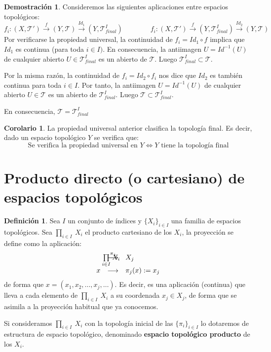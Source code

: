\documentclass[12pt,twoside]{report}
\newcommand\mc[1]{\mathcal{#1}}
\theoremstyle{azul}
\theoremstyle{azul2}
\theoremstyle{plain}
\theoremstyle{definition}
\newtheorem*{defi}{Definición}
\newtheorem*{dem}{Demostración}
\newtheorem*{cor}{Corolario}
\theoremstyle{remark}
\begin{document}
\begin{dem}
Consideremos las siguientes aplicaciones entre espacios topológicos:
$$f_i: (X,\mc{T}')\stackrel{f}{\longrightarrow}(Y,\mc{T})\stackrel{Id_1}{\longrightarrow}(Y,\mc{T}_{final}^I) \qquad\qquad f_i: (X,\mc{T}')\stackrel{f}{\longrightarrow}(Y,\mc{T}_{final}^I)\stackrel{Id_2}{\longrightarrow}(Y,\mc{T})$$
Por verificarse la propiedad universal, la continuidad de $f_i= Id_1\circ f$ implica que $Id_1$ es continua (para toda $i\in I)$. En consecuencia, la antiimagen $U=Id^{-1}(U)$ de cualquier abierto $U\in \mc{T}_{final}^I$ es un abierto de $\mc{T}$. Luego $\mc{T}_{final}^I\subset\mc{T}$.

Por la misma razón, la continuidad de $f_i=Id_2\circ f_i$ nos dice que $Id_2$ es también continua para toda $i\in I$. Por tanto, la antiimagen $U=Id^{-1}(U)$ de cualquier abierto $U\in \mc{T}$ es un abierto de $\mc{T}_{final}^I$. Luego $\mc{T}\subset\mc{T}_{final}^I$. 

En consecuencia, $\mc{T}=\mc{T}_{final}^I$
\end{dem}
\begin{cor}
La propiedad universal anterior clasifica la topología final. Es decir, dado un espacio topológico $Y$ se verifica que:
$$\text{Se verifica la propiedad universal en }Y\Longleftrightarrow Y \text{ tiene la topología final}$$ 
\end{cor}

\section{Producto directo (o cartesiano) de espacios topológicos} \label{sec:producto}
\begin{defi}
Sea $I$ un conjunto de índices y $\{X_i\}_{i\in I}$ una familia de espacios topológicos. Sea $\underset{i\in I}{\prod} \: X_i$  el producto cartesiano de los $X_i$, la proyección se define como la aplicación:
$$\begin{array}{rcl}
      \underset{i\in I}{\prod} \: X_i \hspace{-10mm} & \stackrel{\pi_j}{\longrightarrow} & X_j\\
      x & \longrightarrow & \pi_j(x) : = x_j
\end{array}$$
de forma que $x=(x_1, x_2, \ldots, x_j, \ldots)$. Es decir, es una aplicación (continua) que lleva a cada elemento de $\underset{i\in I}{\prod} \: X_i$ a su coordenada $x_j \in X_j$, de forma que se asimila a la proyección habitual que ya conocemos. 

Si consideramos $\underset{i\in I}{\prod} \: X_i$ con la topología inicial de las $\{\pi_i\}_{i\in I}$ lo dotaremos de estructura de espacio topológico, denominado \textbf{espacio topológico producto} de los $X_i$.
\end{defi}
\end{document}
